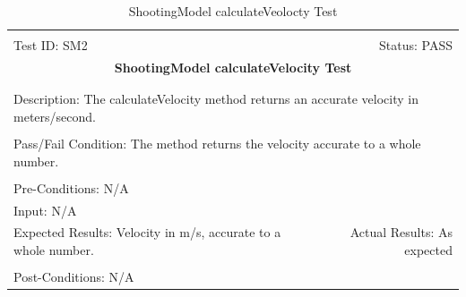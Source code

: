 \documentclass[11pt]{article}
\begin{document}
\begin{center}
\begin{table}[H]
\begin{tabular}{|l r|}\hline&\\[-2mm]
	Test ID: SM2	&Status: PASS\\[-3mm]
	\multicolumn{2}{|c|}{\textbf{\large{ShootingModel calculateVelocity Test}}}\\&\\\hline&\\[-3mm]
	\multicolumn{2}{|p{\textwidth}|}{Description: The calculateVelocity method returns an accurate velocity in meters/second.}\\[1mm]\hline&\\[-3mm]
	\multicolumn{2}{|p{\textwidth}|}{Pass/Fail Condition: The method returns the velocity accurate to a whole number.}\\[1mm]\hline&\\[-3mm]
	\multicolumn{2}{|p{\textwidth}|}{Pre-Conditions: N/A}\\[4mm]
	\multicolumn{2}{|p{\textwidth}|}{Input: N/A}\\[2mm]\hline
	\multicolumn{1}{|p{0.49\textwidth}}{Expected Results: Velocity in m/s, accurate to a whole number.}	&\multicolumn{1}{|p{0.45\textwidth}|}{Actual Results: As expected}\\\hline&\\[-3mm]
	\multicolumn{2}{|p{\textwidth}|}{Post-Conditions: N/A}\\\hline
\end{tabular}
\caption{ShootingModel calculateVeolocty Test}
\end{table}
\end{center}
\end{document}

